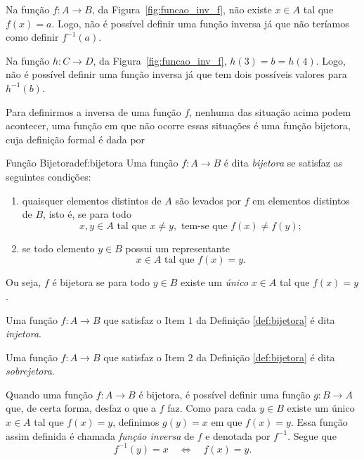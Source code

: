Na função $f\colon A\to B$, da Figura~\ref{fig:funcao_inv_f},
não existe $x\in A$ tal que $f(x)=a$.
Logo, não é possível definir uma função inversa já que não
teríamos como definir $f^{-1}(a)$.

Na função $h\colon C\to D$, da Figura~\ref{fig:funcao_inv_f}, $h(3)=b=h(4)$.
Logo, não é possível definir uma função inversa já que tem dois possíveis
valores para $h^{-1}(b)$.

Para definirmos a inversa de uma função $f$, nenhuma das situação acima podem
acontecer, uma função em que não ocorre essas situações é uma função bijetora,
cuja definição formal é dada por

\begin{definicao}{Função Bijetora}{def:bijetora}
  Uma função $f\colon A\to B$ é dita \emph{bijetora}
  se satisfaz  as seguintes condições:
  \begin{enumerate}
    \item quaisquer elementos distintos de $A$ são levados por $f$ em elementos
      distintos de $B$, isto é, se para todo
      \[
       x, y\in A \text{ tal que } x \neq y, \text{ tem-se que } f(x) \neq f(y);
      \]

    \item se todo elemento $y \in B$ possui um representante
      \[
        x \in A \text{ tal que } f(x)=y.
      \]
  \end{enumerate}
\end{definicao}

Ou seja, $f$ é bijetora se para todo $y\in B$ existe um
\emph{único} $x\in A$ tal que $f(x)=y$.

Uma função $f\colon A\to B$ que satisfaz o Item $1$ da Definição
\ref{def:bijetora} é dita \emph{injetora}.

Uma função $f\colon A\to B$ que satisfaz o Item $2$ da Definição
\ref{def:bijetora} é dita \emph{sobrejetora}.

Quando uma função $f\colon A\to B$ é bijetora, é possível definir uma
função $g\colon B \to A$ que, de certa forma, desfaz o que a $f$ faz.
Como para cada $y\in B$ existe um único $x\in A$ tal que $f(x)=y$,
definimos  $g(y)=x$ em que $f(x)=y$. Essa função assim definida é
chamada \emph{função inversa}
de $f$ e denotada por $f^{-1}$. Segue que
\[
  f^{-1}(y) = x
  \quad\Leftrightarrow\quad
  f(x) = y.
\]

